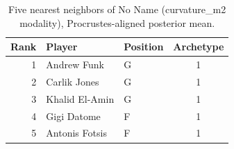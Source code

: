 \begin{table}[htbp]
  \centering\small
  \begin{tabular}{rllc}
    \toprule
    Rank & Player & Position & Archetype \\
    \midrule
    1 & Andrew Funk & G & 1 \\
    2 & Carlik Jones & G & 1 \\
    3 & Khalid El-Amin & G & 1 \\
    4 & Gigi Datome & F & 1 \\
    5 & Antonis Fotsis & F & 1 \\
    \bottomrule
  \end{tabular}
  \caption{Five nearest neighbors of No Name (curvature_m2 modality), Procrustes-aligned posterior mean.}
  \label{tab:No_Name_neighbors_curvature_m2}
\end{table}

